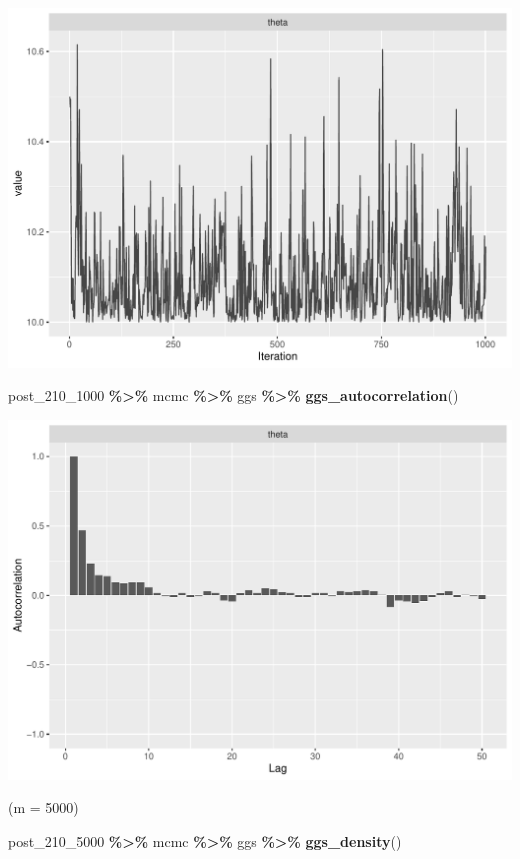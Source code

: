 \documentclass[
]{article}
\newenvironment{Shaded}{\begin{snugshade}}{\end{snugshade}}
\newcommand{\FunctionTok}[1]{\textcolor[rgb]{0.13,0.29,0.53}{\textbf{#1}}}
\newcommand{\NormalTok}[1]{#1}
\newcommand{\SpecialCharTok}[1]{\textcolor[rgb]{0.81,0.36,0.00}{\textbf{#1}}}
\begin{document}
\begin{center}\includegraphics[width=0.8\linewidth]{Bayes_stat_hw3_files/figure-latex/unnamed-chunk-38-2} \end{center}

\begin{Shaded}
\begin{Highlighting}[]
\NormalTok{post\_210\_1000 }\SpecialCharTok{\%\textgreater{}\%}\NormalTok{ mcmc }\SpecialCharTok{\%\textgreater{}\%}\NormalTok{ ggs }\SpecialCharTok{\%\textgreater{}\%} \FunctionTok{ggs\_autocorrelation}\NormalTok{()}
\end{Highlighting}
\end{Shaded}

\begin{center}\includegraphics[width=0.8\linewidth]{Bayes_stat_hw3_files/figure-latex/unnamed-chunk-38-3} \end{center}

(m = 5000)

\begin{Shaded}
\begin{Highlighting}[]
\NormalTok{post\_210\_5000 }\SpecialCharTok{\%\textgreater{}\%}\NormalTok{ mcmc }\SpecialCharTok{\%\textgreater{}\%}\NormalTok{ ggs }\SpecialCharTok{\%\textgreater{}\%} \FunctionTok{ggs\_density}\NormalTok{()}
\end{Highlighting}
\end{Shaded}
\end{document}
